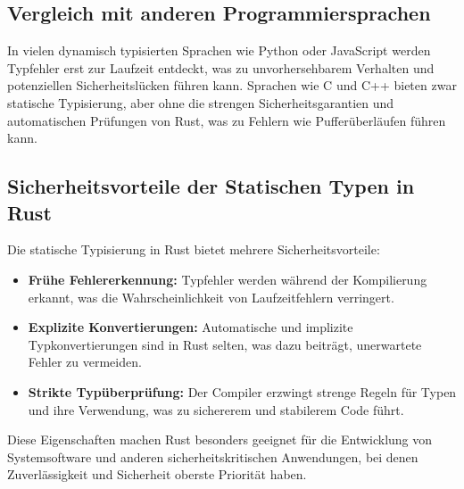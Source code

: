 \subsection{Vergleich mit anderen Programmiersprachen}

In vielen dynamisch typisierten Sprachen wie Python oder JavaScript werden Typfehler erst zur Laufzeit entdeckt, was zu unvorhersehbarem Verhalten und potenziellen Sicherheitslücken führen kann. Sprachen wie C und C++ bieten zwar statische Typisierung, aber ohne die strengen Sicherheitsgarantien und automatischen Prüfungen von Rust, was zu Fehlern wie Pufferüberläufen führen kann.

\subsection{Sicherheitsvorteile der Statischen Typen in Rust}

Die statische Typisierung in Rust bietet mehrere Sicherheitsvorteile:
\begin{itemize}
    \item \textbf{Frühe Fehlererkennung:} Typfehler werden während der Kompilierung erkannt, was die Wahrscheinlichkeit von Laufzeitfehlern verringert.
    \item \textbf{Explizite Konvertierungen:} Automatische und implizite Typkonvertierungen sind in Rust selten, was dazu beiträgt, unerwartete Fehler zu vermeiden.
    \item \textbf{Strikte Typüberprüfung:} Der Compiler erzwingt strenge Regeln für Typen und ihre Verwendung, was zu sichererem und stabilerem Code führt.
\end{itemize}
\noindent
Diese Eigenschaften machen Rust besonders geeignet für die Entwicklung von Systemsoftware und anderen sicherheitskritischen Anwendungen, bei denen Zuverlässigkeit und Sicherheit oberste Priorität haben.
